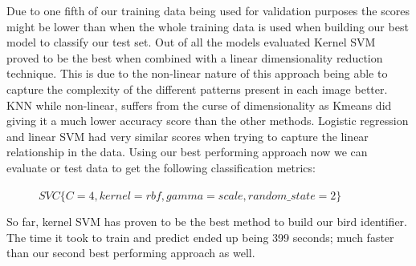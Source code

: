 \documentclass[11pt]{article}
\begin{document}
\begin{singlespace}
Due to one fifth of our training data being used for validation purposes the scores might be lower than when the whole training data is used when building our best model to classify our test set. Out of all the models evaluated Kernel SVM proved to be the best when combined with a linear dimensionality reduction technique. This is due to the non-linear nature of this approach being able to capture the complexity of the different patterns present in each image better. KNN while non-linear, suffers from the curse of dimensionality as Kmeans did giving it a much lower accuracy score than the other methods. Logistic regression and linear SVM had very similar scores when trying to capture the linear relationship in the data. Using our best performing approach now we can evaluate or test data to get the following classification metrics:

\begin{figure}[h]
    \centering
    
    \caption{$SVC\{C=4,kernel=rbf,gamma=scale,random\_state=2\}$}
\end{figure} 

 So far, kernel SVM has proven to be the best method to build our bird identifier. The time it took to train and predict ended up being 399 seconds; much faster than our second best performing approach as well. \\


\end{singlespace}
\end{document}
